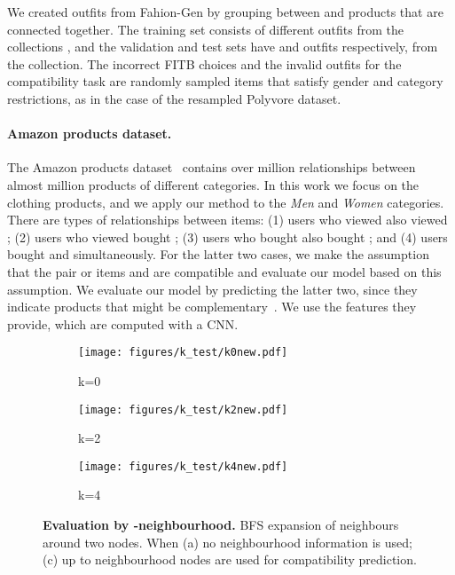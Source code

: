 \documentclass[10pt,twocolumn,letterpaper]{article}
\begin{document}
We created outfits from Fahion-Gen by grouping between  and  products that are connected together. The training set consists of  different outfits from the collections , and the validation and test sets have  and  outfits respectively, from the  collection. The incorrect FITB choices and the invalid outfits for the compatibility task are randomly sampled items that satisfy gender and category restrictions, as in the case of the resampled Polyvore dataset.








\paragraph{Amazon products dataset.}
\label{sssec:amazon_dataset}
The Amazon products dataset~\cite{mcauley2015image, he2016ups} contains over  million relationships between almost  million products of different categories. In this work we focus on the clothing products, and we apply our method to the \emph{Men} and \emph{Women} categories. There are  types of relationships between items: (1) users who viewed  also viewed ; (2) users who viewed  bought ; (3) users who bought  also bought ; and (4) users bought  and  simultaneously. For the latter two cases, we make the assumption that the pair or items  and  are compatible and evaluate our model based on this assumption. 
We evaluate our model by predicting the latter two, since they indicate products that might be complementary~\cite{mcauley2015image}. We use the features they provide, which are computed with a CNN.

\begin{figure}[t]
\begin{center}
\begin{subfigure}{.33\columnwidth}
  \centering
  \texttt{[image: figures/k\_test/k0new.pdf]}
  \caption{k=0}
  \label{fig:k0}
\end{subfigure}\begin{subfigure}{.33\columnwidth}
  \centering
  \texttt{[image: figures/k\_test/k2new.pdf]}
  \caption{k=2}
  \label{fig:k2}
\end{subfigure}\begin{subfigure}{.33\columnwidth}
  \centering
  \texttt{[image: figures/k\_test/k4new.pdf]}
  \caption{k=4}
  \label{fig:k4}
\end{subfigure}\end{center}
\caption{\textbf{Evaluation by -neighbourhood.} BFS expansion of  neighbours around two nodes. When (a)  no neighbourhood information is used; (c)  up to  neighbourhood nodes are used for compatibility prediction.}
\end{figure}
\end{document}
